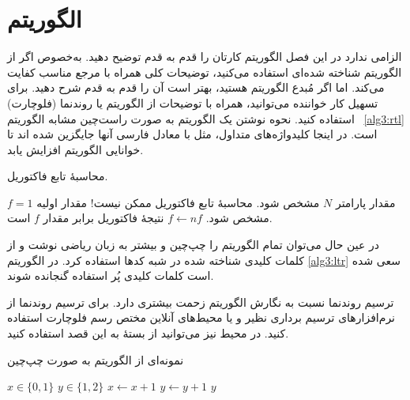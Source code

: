 \section{الگوریتم}
الزامی ندارد در این فصل الگوریتم کارتان را قدم به قدم توضیح دهید. به‌خصوص اگر از الگوریتم شناخته شده‌ای استفاده می‌کنید، توضیحات کلی همراه با مرجع مناسب کفایت می‌کند. اما اگر مُبدع الگوریتم هستید، بهتر است آن را قدم به قدم شرح دهید. برای تسهیل کار خواننده می‌توانید، همراه با توضیحات از الگوریتم یا روندنما (فلوچارت) استفاده کنید. نحوه نوشتن یک الگوریتم به صورت راست‌چین مشابه الگوریتم~%
\ref{alg3:rtl} 
است. در اینجا کلیدواژه‌های متداول، مثل 
با معادل فارسی آنها جایگزین شده اند تا خوانایی الگوریتم افزایش یابد.
\begin{algorithm}[H] %
\caption{\small
محاسبهٔ تابع فاکتوریل.}
\label{alg3:rtl}
\begin{algorithmic}[1] \small %
\State 
مقدار پارامتر $N$ مشخص شود.
  \State 
محاسبهٔ تابع فاکتوریل ممکن نیست!
\Else
  \State 
مقدار اولیه $f=1$ مشخص شود.
    \State $f \gets nf$ 
  \EndFor
  \State 
نتیجهٔ فاکتوریل برابر مقدار $f$ است.
\EndIf
\end{algorithmic}
\end{algorithm}

در عین حال می‌توان تمام الگوریتم را چپ‌چین و بیشتر به زبان ریاضی نوشت و از کلمات کلیدی شناخته شده در شبه کدها استفاده کرد. در الگوریتم 
\ref{alg3:ltr} 
سعی شده است کلمات کلیدی پُر استفاده گنجانده شوند.

ترسیم روندنما نسبت به نگارش الگوریتم زحمت بیشتری دارد. برای ترسیم روندنما از نرم‌افزارهای ترسیم برداری%
نظیر 
 و  
یا محیط‌های آنلاین مختص رسم فلوچارت استفاده کنید. در محیط \latex نیز می‌توانید از بستهٔ 
به این قصد استفاده کنید.

\begin{algorithm}[H] %
\caption{\small
نمونه‌ای از الگوریتم به صورت چپ‌چین}
\label{alg3:ltr}
\begin{latin}\small
\begin{algorithmic}[1] %
\Require $x \in \{0,1\}$
\Ensure $y \in \{1,2\}$
\State{}
\Statex{}
\State{} 
  \State{}
\EndWhile
%
  \State{}
\EndFor
%
\Repeat
  \State{}
%
  \State{}
  \State{}
\Else
  \State{}
\EndIf
  \State $x \gets x + 1$ 
\State $y \gets y + 1$ 
\State\Return $y$ 
\end{algorithmic}
\end{latin}
\end{algorithm}


